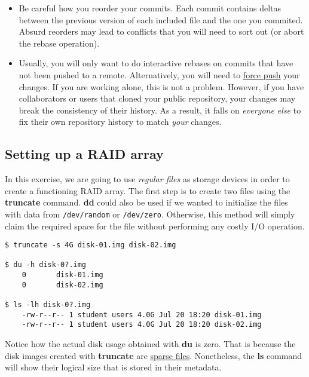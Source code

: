 \begin{itemize}
    \item Be careful how you reorder your commits. Each commit contains deltas
          between the previous version of each included file and the one you
          commited. Absurd reorders may lead to conflicts that you will need to
          sort out (or abort the rebase operation).

    \item Usually, you will only want to do interactive rebases on commits that
          have not been pushed to a remote. Alternatively, you will need to
          \href{https://stackoverflow.com/questions/5509543/how-do-i-properly-force-a-git-push}
          {force push} your changes. If you are working alone, this is not a
          problem. However, if you have collaborators or users that cloned your
          public repository, your changes may break the consistency of their
          history. As a result, it falls on \textit{everyone else} to fix their
          own repository history to match \textit{your} changes.
\end{itemize}

\subsection{Setting up a RAID array}

In this exercise, we are going to use \textit{regular files} as storage devices
in order to create a functioning RAID array. The first step is to create two
files using the \textbf{truncate} command. \textbf{dd} could also be used if we
wanted to initialize the files with data from \texttt{/dev/random} or
\texttt{/dev/zero}. Otherwise, this method will simply claim the required space
for the file without performing any costly I/O operation.

\begin{lstlisting}[style=bashstyle]
$ truncate -s 4G disk-01.img disk-02.img

$ du -h disk-0?.img
    0       disk-01.img
    0       disk-02.img

$ ls -lh disk-0?.img
    -rw-r--r-- 1 student users 4.0G Jul 20 18:20 disk-01.img
    -rw-r--r-- 1 student users 4.0G Jul 20 18:20 disk-02.img
\end{lstlisting}

Notice how the actual disk usage obtained with \textbf{du} is zero. That is
because the disk images created with \textbf{truncate} are
\href{https://wiki.archlinux.org/title/Sparse_file}{sparse files}. Nonetheless,
the \textbf{ls} command will show their logical size that is stored in their
metadata.

